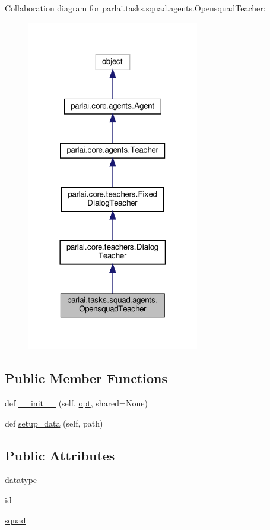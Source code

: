 Collaboration diagram for parlai.\+tasks.\+squad.\+agents.\+Opensquad\+Teacher\+:
\nopagebreak
\begin{figure}[H]
\begin{center}
\leavevmode
\includegraphics[width=213pt]{d9/d0b/classparlai_1_1tasks_1_1squad_1_1agents_1_1OpensquadTeacher__coll__graph}
\end{center}
\end{figure}
\subsection*{Public Member Functions}
\begin{DoxyCompactItemize}
\item 
def \hyperlink{classparlai_1_1tasks_1_1squad_1_1agents_1_1OpensquadTeacher_a1b05b43517db8f76098f6901d2b7516b}{\+\_\+\+\_\+init\+\_\+\+\_\+} (self, \hyperlink{classparlai_1_1core_1_1agents_1_1Teacher_a3ce6243860ce978a897922863ed32fa4}{opt}, shared=None)
\item 
def \hyperlink{classparlai_1_1tasks_1_1squad_1_1agents_1_1OpensquadTeacher_a3cec5f85dee7d30e1a80a4ce8c775a07}{setup\+\_\+data} (self, path)
\end{DoxyCompactItemize}
\subsection*{Public Attributes}
\begin{DoxyCompactItemize}
\item 
\hyperlink{classparlai_1_1tasks_1_1squad_1_1agents_1_1OpensquadTeacher_afcbd95d073286e65923c88490ed03e35}{datatype}
\item 
\hyperlink{classparlai_1_1tasks_1_1squad_1_1agents_1_1OpensquadTeacher_a623ab6df284c53f1266c9a24e95c981b}{id}
\item 
\hyperlink{classparlai_1_1tasks_1_1squad_1_1agents_1_1OpensquadTeacher_af69eaf825785fc1f53f34aa45e5b6c3f}{squad}
\end{DoxyCompactItemize}
